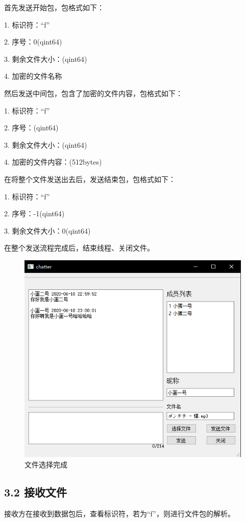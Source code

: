 \documentclass[UTF8]{ctexart}
\begin{document}
首先发送开始包，包格式如下：

1. 标识符：“f”

2. 序号：0(qint64)

3. 剩余文件大小：(qint64)

4. 加密的文件名称

然后发送中间包，包含了加密的文件内容，包格式如下：

1. 标识符：“f”

2. 序号：(qint64)

3. 剩余文件大小：(qint64)

4. 加密的文件内容：(512bytes)

在将整个文件发送出去后，发送结束包，包格式如下：

1. 标识符：“f”

2. 序号：-1(qint64)

3. 剩余文件大小：0(qint64)

在整个发送流程完成后，结束线程、关闭文件。

\begin{figure}[H]
\includegraphics[width=\textwidth]{pic/filechoose2.PNG}
\caption{文件选择完成}
\end{figure}

\subsection*{3.2 接收文件}
接收方在接收到数据包后，查看标识符，若为“f”，则进行文件包的解析。
\end{document}

